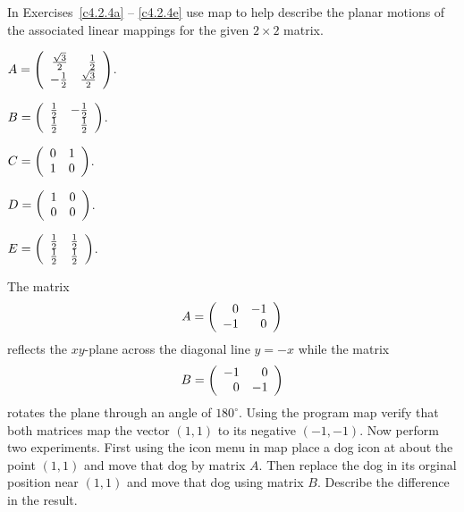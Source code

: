 \documentclass{ximera}
\begin{document}
\noindent In Exercises~\ref{c4.2.4a} -- \ref{c4.2.4e} use {\sf map} to
help describe the planar motions of the associated linear mappings for the
given $2\times 2$ matrix.
\begin{exercise} \label{c4.2.4a}
$A=\left(\begin{array}{rr} \frac{\sqrt{3}}{2} & \frac{1}{2}\\ -\frac{1}{2} &\frac{\sqrt{3}}{2}\end{array}\right)$.
\end{exercise}
\begin{exercise} \label{c4.2.4b}
$B = \left(\begin{array}{rr} \frac{1}{2} & -\frac{1}{2}\\ \frac{1}{2} &\frac{1}{2}\end{array}\right)$.
\end{exercise}
\begin{exercise} \label{c4.2.4c}
$C = \left(\begin{array}{rr} 0 & 1\\ 1 &0\end{array}\right)$.
\end{exercise}
\begin{exercise} \label{c4.2.4d}
$D = \left(\begin{array}{rr} 1 & 0\\ 0 &0\end{array}\right)$.
\end{exercise}
\begin{exercise} \label{c4.2.4e}
$E = \left(\begin{array}{rr} \frac{1}{2} & \frac{1}{2}\\ \frac{1}{2} &\frac{1}{2}\end{array}\right)$.
\end{exercise}

\begin{exercise}  \label{c4.2.5}
The matrix 
\[
A = \left(\begin{array}{rr} 0 & -1\\ -1 &0\end{array}\right)
\]
reflects the $xy$-plane across the diagonal line $y=-x$ while the matrix
\[
B=\left(\begin{array}{rr} -1 & 0\\ 0 &-1\end{array}\right)
\]
rotates the plane through an angle of $180^\circ$. Using the program 
{\sf map} verify that both matrices map the vector $(1,1)$ to its negative
$(-1,-1)$.  Now perform two experiments.  First using the {\sf icon} menu in 
{\sf map} place a dog icon at about the point $(1,1)$ and move that dog by 
matrix $A$.  Then replace the dog in its orginal position near $(1,1)$ and 
move that dog using matrix $B$.  Describe the difference in the result.
\end{exercise}   
\end{document}
